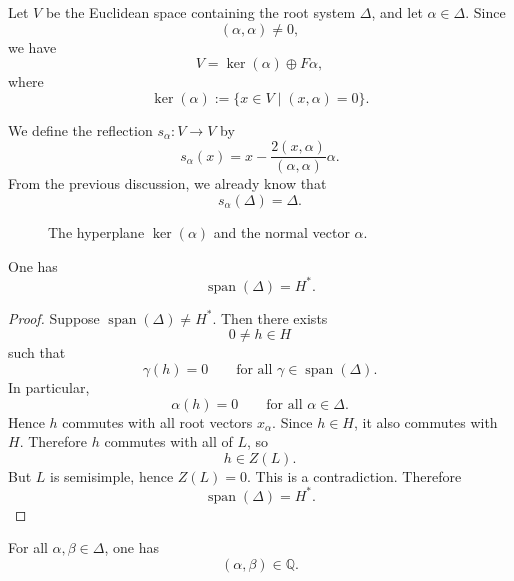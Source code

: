 
Let \(V\) be the Euclidean space containing the root system \(\Delta\), and let
\(\alpha\in \Delta\). Since
\[
    (\alpha,\alpha)\neq 0,
\]
we have
\[
    V=\ker(\alpha)\oplus F\alpha,
\]
where
\[
    \ker(\alpha):=\{x\in V\mid (x,\alpha)=0\}.
\]

We define the reflection \(s_\alpha:V\to V\) by
\[
    s_\alpha(x)=x-\frac{2(x,\alpha)}{(\alpha,\alpha)}\alpha.
\]
From the previous discussion, we already know that
\[
    s_\alpha(\Delta)=\Delta.
\]

\begin{figure}[h]
    \centering
    \caption{The hyperplane \(\ker(\alpha)\) and the normal vector \(\alpha\).}
\end{figure}

\begin{lemma}
    One has
    \[
        \operatorname{span}(\Delta)=H^*.
    \]
\end{lemma}

\begin{proof}
    Suppose \(\operatorname{span}(\Delta)\neq H^*\). Then there exists
    \[
        0\neq h\in H
    \]
    such that
    \[
        \gamma(h)=0
        \qquad
        \text{for all }\gamma\in \operatorname{span}(\Delta).
    \]
    In particular,
    \[
        \alpha(h)=0
        \qquad
        \text{for all }\alpha\in \Delta.
    \]
    Hence \(h\) commutes with all root vectors \(x_\alpha\). Since \(h\in H\), it also
    commutes with \(H\). Therefore \(h\) commutes with all of \(L\), so
    \[
        h\in Z(L).
    \]
    But \(L\) is semisimple, hence \(Z(L)=0\). This is a contradiction. Therefore
    \[
        \operatorname{span}(\Delta)=H^*.
    \]
\end{proof}

\begin{lemma}
    For all \(\alpha,\beta\in \Delta\), one has
    \[
        (\alpha,\beta)\in \mathbb{Q}.
    \]
\end{lemma}

